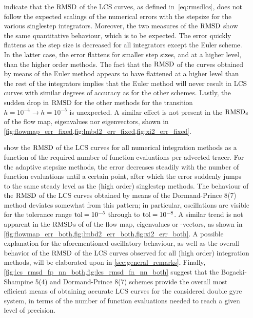  indicate that the
$\operatorname{RMSD}$ of the LCS curves, as defined in~\cref{eq:rmsdlcs}, does not follow the
expected scalings of the numerical errors with the stepsize for the various
singlestep integrators. Moreover, the two measures of the $\operatorname{RMSD}$ show the same
quantitative behaviour, which is to be expected. The error quickly flattens as
the step size is decreased for all integrators except the Euler scheme. In the
latter case, the error flattens for smaller step sizes, and at a higher level,
than the higher order methods. The fact that the $\operatorname{RMSD}$  of the curves obtained
by means of the Euler method appears to have flattened  at a higher level than
the rest of the integrators implies that the Euler method will never result in
LCS curves with similar degrees of accuracy as for the other schemes. Lastly,
the sudden drop in $\operatorname{RMSD}$ for the other methods for the transition
$h=10^{-4}\rightarrow{h=10^{-5}}$ is unexpected. A similar effect is not present
in the $\operatorname{RMSD}$s of the flow map, eigenvalues nor eigenvectors, shown in
\cref{fig:flowmap_err_fixed,fig:lmbd2_err_fixed,fig:xi2_err_fixed}.



 show the $\operatorname{RMSD}$ of the
LCS curves for all numerical integration methods as a function of the required
number of function evaluations per advected tracer. For the adaptive stepsize
methods, the error decreases steadily with the number of function evaluations
until a certain point, after which the error suddenly jumps to the same steady
level as the (high order) singlestep methods. The behaviour of the $\operatorname{RMSD}$ of
the LCS curves obtained by means of the Dormand-Prince 8(7) method deviates
somewhat from this pattern; in particular, oscillations are visible for the
tolerance range $\textnormal{tol}=10^{-5}$ through to
$\textnormal{tol}=10^{-8}$. A similar trend is not apparent in the $\operatorname{RMSD}$s of
of the flow map, eigenvalues or -vectors, as shown in
\cref{fig:flowmap_err_both,fig:lmbd2_err_both,fig:xi2_err_both}. A possible
explanation for the aforementioned oscillatory behaviour, as well as the
overall behavior of the $\operatorname{RMSD}$ of the LCS curves observed for all (high
order) integration methods, will be elaborated upon in
\cref{sec:general_remarks}. Finally,
\cref{fig:lcs_rmsd_fp_nn_both,fig:lcs_rmsd_fn_nn_both} suggest that the
Bogacki-Shampine 5(4) and Dormand-Prince 8(7) schemes provide the overall most
efficient means of obtaining accurate LCS curves for the considered double gyre
system, in terms of the number of function evaluations needed to reach a given
level of precision.

